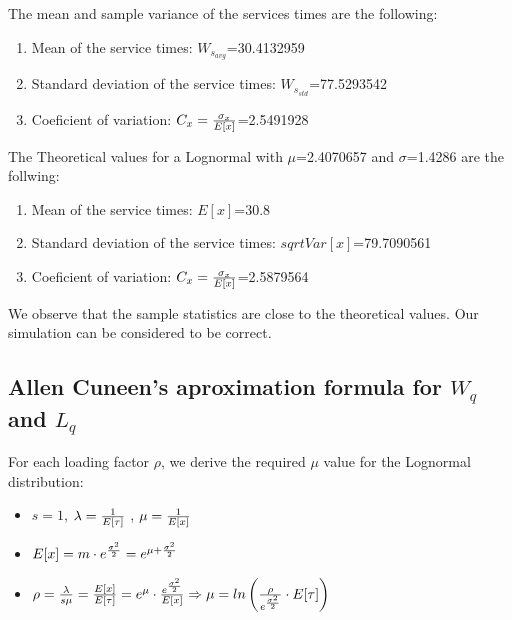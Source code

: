 \documentclass[]{article}
\providecommand{\tightlist}{%
  \setlength{\itemsep}{0pt}\setlength{\parskip}{0pt}}
\begin{document}
The mean and sample variance of the services times are the following:

\begin{enumerate}
\def\labelenumi{\arabic{enumi}.}
\tightlist
\item
  Mean of the service times: \(W_{s_{avg}}\)=30.4132959
\item
  Standard deviation of the service times: \(W_{s_{std}}\)=77.5293542
\item
  Coeficient of variation: \(C_{x}={ \sigma_{x} \over E[x] }\)=2.5491928
\end{enumerate}

The Theoretical values for a Lognormal with \(\mu\)=2.4070657 and
\(\sigma\)=1.4286 are the follwing:

\begin{enumerate}
\def\labelenumi{\arabic{enumi}.}
\tightlist
\item
  Mean of the service times: \(E[x]\)=30.8
\item
  Standard deviation of the service times: \(sqrt{Var[x]}\)=79.7090561
\item
  Coeficient of variation: \(C_{x}={ \sigma_{x} \over E[x] }\)=2.5879564
\end{enumerate}

We observe that the sample statistics are close to the theoretical
values. Our simulation can be considered to be correct.

\subsection{\texorpdfstring{Allen Cuneen's aproximation formula for
\(W_{q}\) and
\(L_{q}\)}{Allen Cuneen's aproximation formula for W\_\{q\} and L\_\{q\}}}\label{allen-cuneens-aproximation-formula-for-w_q-and-l_q}

For each loading factor \(\rho\), we derive the required \(\mu\) value
for the Lognormal distribution:

\begin{itemize}
\tightlist
\item
  \(s = 1\), \(\lambda = { 1 \over E[\tau] }\) ,
  \(\mu = {1 \over E[x]}\)
\item
  \(E[x] = m \cdot e^{\sigma^{2} \over 2} = e^{\mu + {\sigma^{2} \over 2} }\)
\item
  \(\rho = { \lambda \over {s\mu}} = { E[x] \over E[\tau] } = e^{\mu} \cdot { e^{\sigma^{2} \over 2} \over E[x] } \Rightarrow \mu = ln \left( { \rho \over e^{ \sigma^{2} \over 2 } } \cdot E[\tau] \right)\)
\end{itemize}
\end{document}
